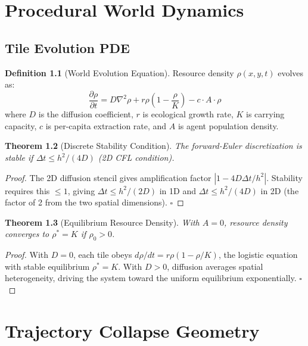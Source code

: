 \documentclass[11pt,a4paper,openany]{book}
\theoremstyle{plain}
\newtheorem{theorem}{Theorem}[chapter]
\theoremstyle{definition}
\newtheorem{definition}[theorem]{Definition}
\theoremstyle{remark}
\begin{document}
\chapter{Procedural World Dynamics}
\label{app:pde}

\section{Tile Evolution PDE}

\begin{definition}[World Evolution Equation]
  Resource density $\rho(x,y,t)$ evolves as:
  \[
    \frac{\partial \rho}{\partial t}
    = D \nabla^2 \rho + r\rho\!\left(1 - \frac{\rho}{K}\right)
    - c \cdot A \cdot \rho
  \]
  where $D$ is the diffusion coefficient, $r$ is ecological growth rate,
  $K$ is carrying capacity, $c$ is per-capita extraction rate, and $A$
  is agent population density.
\end{definition}

\begin{theorem}[Discrete Stability Condition]
  The forward-Euler discretization is stable if
  $\Delta t \leq h^2 / (4D)$ (2D CFL condition).
\end{theorem}
\begin{proof}
  The 2D diffusion stencil gives amplification factor
  $|1 - 4D\Delta t/h^2|$. Stability requires this $\leq 1$, giving
  $\Delta t \leq h^2/(2D)$ in 1D and $\Delta t \leq h^2/(4D)$ in 2D
  (the factor of 2 from the two spatial dimensions). $\square$
\end{proof}

\begin{theorem}[Equilibrium Resource Density]
  With $A=0$, resource density converges to $\rho^* = K$ if $\rho_0 > 0$.
\end{theorem}
\begin{proof}
  With $D=0$, each tile obeys $d\rho/dt = r\rho(1-\rho/K)$, the logistic
  equation with stable equilibrium $\rho^* = K$. With $D > 0$, diffusion
  averages spatial heterogeneity, driving the system toward the uniform
  equilibrium exponentially. $\square$
\end{proof}

\chapter{Trajectory Collapse Geometry}
\label{app:trajectory}
\end{document}
